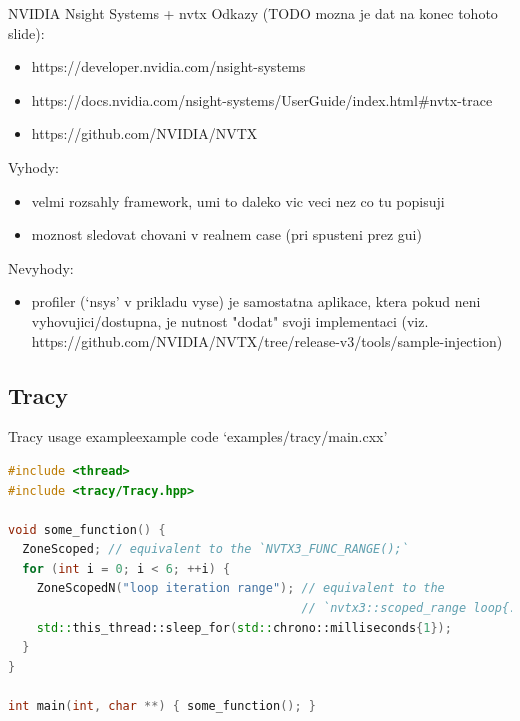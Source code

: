 \documentclass[aspectratio=169]{beamer}
\begin{document}
\begin{frame}{NVIDIA Nsight Systems + nvtx}
    Odkazy (TODO mozna je dat na konec tohoto slide):

    \begin{itemize}
         \item https://developer.nvidia.com/nsight-systems
         \item https://docs.nvidia.com/nsight-systems/UserGuide/index.html\#nvtx-trace
         \item https://github.com/NVIDIA/NVTX
    \end{itemize}

    Vyhody:

    \begin{itemize}
        \item velmi rozsahly framework, umi to daleko vic veci nez co tu popisuji
        \item moznost sledovat chovani v realnem case (pri spusteni prez gui)
    \end{itemize}

    Nevyhody:

    \begin{itemize}
        \item profiler (`nsys' v prikladu vyse) je samostatna aplikace, ktera pokud neni vyhovujici/dostupna, je nutnost "dodat" svoji implementaci (viz. https://github.com/NVIDIA/NVTX/tree/release-v3/tools/sample-injection)
    \end{itemize}

\end{frame}


\subsection{Tracy}

\begin{frame}[fragile]{Tracy usage example}{example code `examples/tracy/main.cxx'}
    
    \begin{lstlisting}[language=C++]
#include <thread>
#include <tracy/Tracy.hpp>

void some_function() {
  ZoneScoped; // equivalent to the `NVTX3_FUNC_RANGE();`
  for (int i = 0; i < 6; ++i) {
    ZoneScopedN("loop iteration range"); // equivalent to the
                                         // `nvtx3::scoped_range loop{...};`
    std::this_thread::sleep_for(std::chrono::milliseconds{1});
  }
}

int main(int, char **) { some_function(); }
    \end{lstlisting}

\end{frame}
\end{document}
